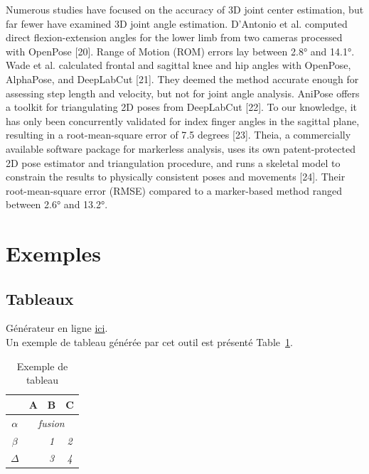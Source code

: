 Numerous studies have focused on the accuracy of 3D joint center estimation, but far fewer have examined 3D joint angle estimation. D’Antonio et al. computed direct flexion-extension angles for the lower limb from two cameras processed with OpenPose [20]. Range of Motion (ROM) errors lay between 2.8° and 14.1°. Wade et al. calculated frontal and sagittal knee and hip angles with OpenPose, AlphaPose, and DeepLabCut [21]. They deemed the method accurate enough for assessing step length and velocity, but not for joint angle analysis. AniPose offers a toolkit for triangulating 2D poses from DeepLabCut [22]. To our knowledge, it has only been concurrently validated for index finger angles in the sagittal plane, resulting in a root-mean-square error of 7.5 degrees [23]. Theia, a commercially available software package for markerless analysis, uses its own patent-protected 2D pose estimator and triangulation procedure, and runs a skeletal model to constrain the results to physically consistent poses and movements [24]. Their root-mean-square error (RMSE) compared to a marker-based method ranged between 2.6° and 13.2°.


\section{Exemples}

\FloatBarrier
\subsection{Tableaux}

Générateur en ligne \href{http://www.tablesgenerator.com/latex_tables}{ici}. \\

Un exemple de tableau générée par cet outil est présenté Table~\ref{tableau_exemple}.

\begin{table}[]
\centering
\begin{tabular}{c|c|c|c|}
\cline{2-4}
                               & \textbf{A}                 & \textbf{B} & \textbf{C} \\ \hline
\multicolumn{1}{|c|}{$\alpha$} & \multicolumn{3}{c|}{\textit{fusion}}                 \\ \hline
\multicolumn{1}{|c|}{$\beta$}  & \multirow{2}{*}{\textit{}} & \textit{1} & \textit{2} \\ \cline{1-1} \cline{3-4} 
\multicolumn{1}{|c|}{$\Delta$} &                            & \textit{3} & \textit{4} \\ \hline
\end{tabular}
\caption{Exemple de tableau}
\label{tableau_exemple}
\end{table}
